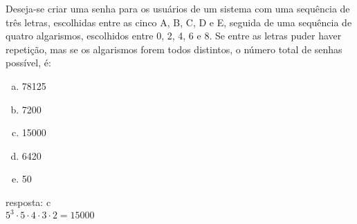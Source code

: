 \begin{ex}
Deseja-se criar uma senha para os usuários de um sistema com uma sequência de três letras, escolhidas entre as cinco A, B, C, D e E, seguida de uma sequência de quatro algarismos, escolhidos entre 0, 2, 4, 6 e 8. Se entre as letras puder haver repetição, mas se os algarismos forem todos distintos, o número total de senhas possível, é: 
   \begin{enumerate}[(a)]
   \item 78125
   \item 7200
   \item 15000
   \item 6420
   \item 50
   \end{enumerate}
     \begin{sol}
     resposta: c \\
     $5^3\cdot5\cdot4\cdot3\cdot2=15000$
     \end{sol}
\end{ex}